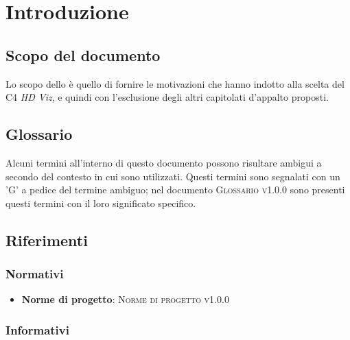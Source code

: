 \documentclass{article}
\begin{document}


\section{Introduzione}%
\label{sec:introduzione}

\subsection{Scopo del documento}%
\label{sub:scopo_del_documento}
Lo scopo dello \textsc{\placeholderTitle} è quello di fornire le motivazioni che hanno indotto alla scelta del  C4 \emph{HD Viz}, e quindi con l'esclusione degli altri capitolati d'appalto proposti.

\subsection{Glossario}%
\label{sub:glossario}
Alcuni termini all'interno di questo documento possono risultare ambigui a secondo del contesto in cui sono utilizzati.
Questi termini sono segnalati con un 'G' a pedice del termine ambiguo; nel documento \textsc{Glossario v1.0.0} sono presenti questi termini con il loro significato specifico.


\subsection{Riferimenti}%
\label{sub:riferimenti}

\subsubsection{Normativi}%
\label{subs:normativi}

\begin{itemize}
	\item \textbf{Norme di progetto}: \textsc{Norme di progetto v1.0.0}
\end{itemize}

\subsubsection{Informativi}%
\label{subs:informativi}
\end{document}
